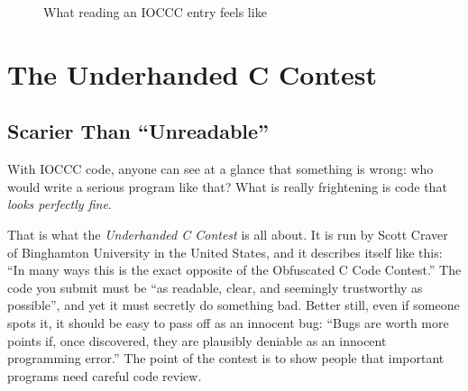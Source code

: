 \begin{figure}[htbp]
  \centering
  \caption{What reading an IOCCC entry feels like}
  \label{fig:ioccc}
\end{figure}

\section{The Underhanded C Contest}

\subsection{Scarier Than \texorpdfstring{``Unreadable''}{“Unreadable”}}

With IOCCC code, anyone can see at a glance that something is wrong: who would write a serious program like that? What is really frightening is code that \emph{looks perfectly fine}.

That is what the \emph{Underhanded C Contest} is all about. It is run by Scott Craver of Binghamton University in the United States, and it describes itself like this: ``In many ways this is the exact opposite of the Obfuscated C Code Contest.'' The code you submit must be ``as readable, clear, and seemingly trustworthy as possible'', and yet it must secretly do something bad. Better still, even if someone spots it, it should be easy to pass off as an innocent bug: ``Bugs are worth more points if, once discovered, they are plausibly deniable as an innocent programming error.'' The point of the contest is to show people that important programs need careful code review.

